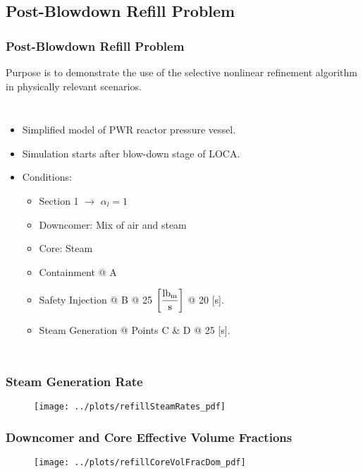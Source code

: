 \documentclass[compress,xcolor=table]{beamer}
\begin{document}
\subsection[Post-Blowdown Refill Problem]{Post-Blowdown Refill Problem}
\begin{frame}
\frametitle{Post-Blowdown Refill Problem}

Purpose is to demonstrate the use of the selective nonlinear refinement algorithm in physically relevant scenarios.

\begin{columns}
\begin{itemize}
\item{Simplified model of PWR reactor pressure vessel.}
\item{Simulation starts after blow-down stage of LOCA.}
\item{Conditions:
\begin{itemize}
\item{Section 1 $\rightarrow$ $\alpha_{l} = 1$}
\item{Downcomer: Mix of air and steam}
\item{Core: Steam}
\item{Containment @ A}
\item{Safety Injection @ B @ 25 $\displaystyle \left[ \frac{\lbm{}}{\text{s}} \right]$ @ 20 [s].}
\item{Steam Generation @ Points C \& D @ 25 [s].}
\end{itemize}
}
\end{itemize}


\begin{figure}[h!t]
\centering
\resizebox{!}{0.65\textheight}{}
\end{figure}
\end{columns}

\end{frame}
\begin{frame}
\frametitle{Steam Generation Rate}

\begin{figure}[h!t]
\centering
\texttt{[image: ../plots/refillSteamRates\_pdf]}
\end{figure}

\end{frame}
\begin{frame}
\frametitle{Downcomer and Core Effective Volume Fractions}

\begin{figure}[h!t]
\centering
\texttt{[image: ../plots/refillCoreVolFracDom\_pdf]}
\end{figure}

\end{frame}
\end{document}
